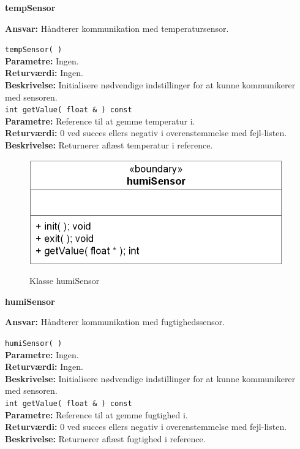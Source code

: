 {\centering
\textbf{tempSensor}\par
}
\textbf{Ansvar:} Håndterer kommunikation med temperatursensor. \

\verb+tempSensor( )+ \\
\textbf{Parametre:} Ingen. \\
\textbf{Returværdi:} Ingen. \\
\textbf{Beskrivelse:} Initialisere nødvendige indstillinger for at kunne kommunikerer med sensoren. \\

\verb+int getValue( float & ) const+ \\
\textbf{Parametre:} Reference til at gemme temperatur i. \\
\textbf{Returværdi:} 0 ved succes ellers negativ i overenstemmelse med fejl-listen. \\
\textbf{Beskrivelse:} Returnerer aflæst temperatur i reference. \\


\begin{figure}[htbp] \centering
{\includegraphics[scale=1.3]{filer/design/Klassediagrammer/sw_psoc_humiSensor}}
\caption{Klasse humiSensor}
\label{fig:sw_psoc_class_humiSensor}
\end{figure} 

{\centering
\textbf{humiSensor}\par
}
\textbf{Ansvar:} Håndterer kommunikation med fugtighedssensor. \

\verb+humiSensor( )+ \\
\textbf{Parametre:} Ingen. \\
\textbf{Returværdi:} Ingen. \\
\textbf{Beskrivelse:} Initialisere nødvendige indstillinger for at kunne kommunikerer med sensoren. \\

\verb+int getValue( float & ) const+ \\
\textbf{Parametre:} Reference til at gemme fugtighed i. \\
\textbf{Returværdi:} 0 ved succes ellers negativ i overenstemmelse med fejl-listen. \\
\textbf{Beskrivelse:} Returnerer aflæst fugtighed i reference. \\

